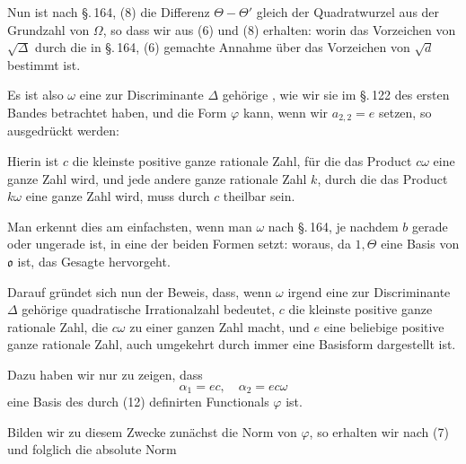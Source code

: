 Nun ist nach \S.\,164, (8) die Differenz $\Theta - \Theta'$ gleich der Quadratwurzel aus der Grundzahl von $\Omega$, so dass wir aus (6) und (8) erhalten:
worin das Vorzeichen von $\sqrt{\Delta}$ durch die in \S.\,164, (6) gemachte Annahme \"uber das Vorzeichen von $\sqrt{d}$ bestimmt ist.

Es ist also $\omega$ eine zur Discriminante $\Delta$ geh\"orige , wie wir sie im \S.\,122 des ersten Bandes betrachtet haben, und die Form $\varphi$ kann, wenn wir $a_{2,2}=e$ setzen, so ausgedr\"uckt werden:

Hierin ist $c$ die kleinste positive ganze rationale Zahl, f\"ur die das Product $c\omega$ eine ganze Zahl wird, und jede andere ganze rationale Zahl $k$, durch die das Product $k\omega$ eine ganze Zahl wird, muss durch $c$ theilbar sein.

Man erkennt dies am einfachsten, wenn man $\omega$ nach \S.\,164, je nachdem $b$ gerade oder ungerade ist, in eine der beiden Formen setzt:
woraus, da $1, \Theta$ eine Basis von $\mathfrak{o}$ ist, das Gesagte hervorgeht.

Darauf gr\"undet sich nun der Beweis, dass, wenn $\omega$ irgend eine zur Discriminante $\Delta$ geh\"orige quadratische Irrationalzahl bedeutet, $c$ die kleinste positive ganze rationale Zahl, die $c\omega$ zu einer ganzen Zahl macht, und $e$ eine beliebige positive ganze rationale Zahl, auch umgekehrt durch
immer eine Basisform dargestellt ist.

Dazu haben wir nur zu zeigen, dass
\[
\alpha_1 = ec, \quad \alpha_2 = ec\omega
\]
eine Basis des durch (12) definirten Functionals $\varphi$ ist.

Bilden wir zu diesem Zwecke zun\"achst die Norm von $\varphi$, so erhalten wir nach (7)
und folglich die absolute Norm
